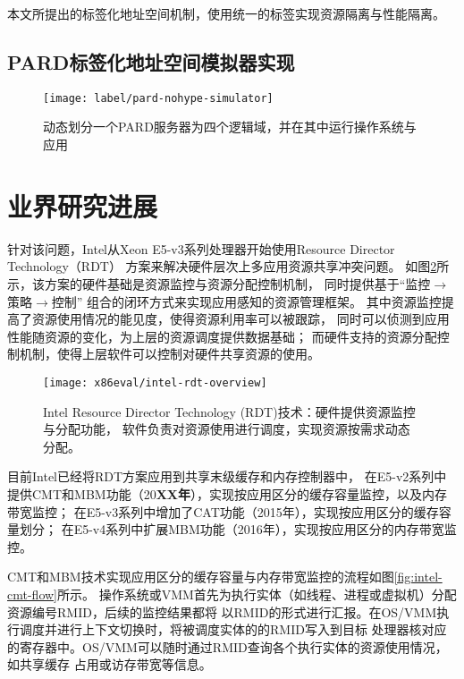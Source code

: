 本文所提出的标签化地址空间机制，使用统一的标签实现资源隔离与性能隔离。


\subsection{PARD标签化地址空间模拟器实现}



\begin{figure}[tb]
  \centering
  \texttt{[image: label/pard-nohype-simulator]}
  \caption{动态划分一个PARD服务器为四个逻辑域，并在其中运行操作系统与应用}
  \label{fig:pard-nohype-simulator}
\end{figure}

\section{业界研究进展}
\label{chap:labeladdrspace:intel-rdt}

针对该问题，Intel从Xeon E5-v3系列处理器开始使用Resource Director Technology（RDT）
方案来解决硬件层次上多应用资源共享冲突问题。
如图\ref{fig:intel-rdt-overview}所示，该方案的硬件基础是资源监控与资源分配控制机制，
同时提供基于``监控$\rightarrow$策略$\rightarrow$控制''
组合的闭环方式来实现应用感知的资源管理框架。
其中资源监控提高了资源使用情况的能见度，使得资源利用率可以被跟踪，
同时可以侦测到应用性能随资源的变化，为上层的资源调度提供数据基础；
而硬件支持的资源分配控制机制，使得上层软件可以控制对硬件共享资源的使用。

\begin{figure}[H]
  \centering
  \texttt{[image: x86eval/intel-rdt-overview]}
  \caption[Intel Resource Director Technology (RDT) 技术示意图]{
    Intel Resource Director Technology (RDT)技术：硬件提供资源监控与分配功能，
    软件负责对资源使用进行调度，实现资源按需求动态分配。}
  \label{fig:intel-rdt-overview}
\end{figure}

目前Intel已经将RDT方案应用到共享末级缓存和内存控制器中，
在E5-v2系列中提供CMT和MBM功能（20\textbf{XX年}），实现按应用区分的缓存容量监控，以及内存带宽监控；
在E5-v3系列中增加了CAT功能（2015年），实现按应用区分的缓存容量划分；
在E5-v4系列中扩展MBM功能（2016年），实现按应用区分的内存带宽监控。

CMT和MBM技术实现应用区分的缓存容量与内存带宽监控的流程如图\ref{fig:intel-cmt-flow}所示。
操作系统或VMM首先为执行实体（如线程、进程或虚拟机）分配资源编号RMID，后续的监控结果都将
以RMID的形式进行汇报。在OS/VMM执行调度并进行上下文切换时，将被调度实体的的RMID写入到目标
处理器核对应的寄存器中。OS/VMM可以随时通过RMID查询各个执行实体的资源使用情况，如共享缓存
占用或访存带宽等信息。
 
